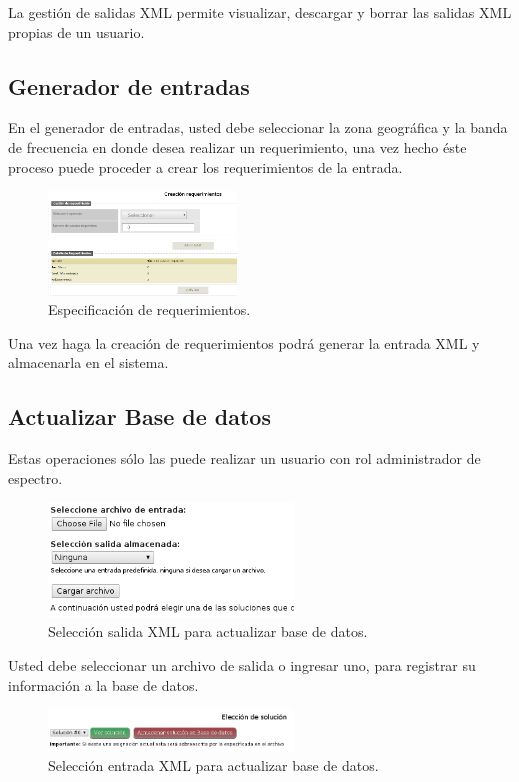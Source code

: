 \begin{multicols}{2}
La gestión de salidas XML permite visualizar, descargar y borrar las salidas XML propias de un usuario.

\subsection*{Generador de entradas}

En el generador de entradas, usted debe seleccionar la zona geográfica y la banda de frecuencia en donde desea realizar un requerimiento, una vez hecho éste proceso puede proceder a crear los requerimientos de la entrada.

\begin{figure}[H]
	\centering
	\includegraphics[width=5cm]{Anexos/Imagenes/ManualUsuario/Requerimientos.png}
	\caption{ Especificación de requerimientos.}
\end{figure}

Una vez haga la creación de requerimientos podrá generar la entrada XML y almacenarla en el sistema.

\subsection*{Actualizar Base de datos}

Estas operaciones sólo las puede realizar un usuario con rol administrador de espectro.

\begin{figure}[H]
	\centering
	\includegraphics[width=6.5cm]{Anexos/Imagenes/ManualUsuario/Entrada.png}
	\caption{ Selección salida XML para actualizar base de datos.}
\end{figure}

Usted debe seleccionar un archivo de salida o ingresar uno, para registrar su información a la base de datos.

\begin{figure}[H]
	\centering
	\includegraphics[width=6.5cm]{Anexos/Imagenes/ManualUsuario/ElegirSolucion.png}
	\caption{ Selección entrada XML para actualizar base de datos.}
\end{figure}


\end{multicols}
